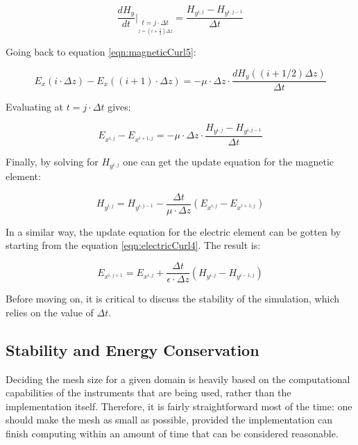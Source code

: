 \begin{equation}
	\label{eqn:timeDerivativeH}
	\frac{d H_y}{dt} \bigg\rvert_{\underset{z = (i + \frac{1}{2}) \Delta z}{t=j \cdot \Delta t}} = \frac{H_{y^{i,j}} - H_{y^{i,j-1}}}{\Delta t}
\end{equation}

Going back to equation \ref{eqn:magneticCurl5}:

\begin{equation}
	\label{eqn:timeDerivativeE2}
	E_x(i \cdot \Delta z) - E_x((i+1) \cdot \Delta z) = -\mu \cdot \Delta z \cdot \frac{d H_y((i+1/2)\Delta z) }{\Delta t}
\end{equation}

Evaluating at $t = j \cdot \Delta t$ gives:

\begin{equation}
	\label{eqn:timeDerivativeE3}
	E_{x^{i,j}} - E_{x^{i+1,j}} = -\mu \cdot \Delta z \cdot \frac{H_{y^{i,j}} - H_{y^{i,j-1}}}{\Delta t}
\end{equation}

Finally, by solving for ${H_{y^{i,j}}}$ one can get the update equation for the magnetic element:
	
\begin{equation}
	\label{eqn:magneticUpdate}
	H_{y^{i,j}} = H_{y^{i,j-1}} - \frac{\Delta t}{\mu \cdot \Delta z}(E_{x^{i,j}} - E_{x^{i+1,j}})
\end{equation}

In a similar way, the update equation for the electric element can be gotten by starting from the equation \ref{eqn:electricCurl4}. The result is:

\begin{equation}
	\label{eqn:electricUpdate}
	E_{x^{i,j+1}} = E_{x^{i,j}} + \frac{\Delta t}{\epsilon \cdot \Delta z}(H_{y^{i,j}} -  H_{y^{i-1,j}})
\end{equation}

Before moving on, it is critical to discuss the stability of the simulation, which relies on the value of $\Delta t$.

\subsection{Stability and Energy Conservation}
Deciding the mesh size for a given domain is heavily based on the computational capabilities of the instruments that are being used, rather than the implementation itself. Therefore, it is fairly straightforward most of the time: one should make the mesh as small as possible, provided the implementation can finish computing within an amount of time that can be considered reasonable.

